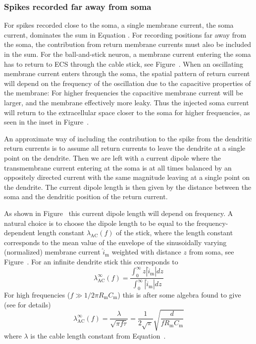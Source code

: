 \subsubsection{Spikes recorded far away from soma}
\label{sec:Spikes:far-spikes}

For spikes recorded close to the soma, a single membrane current, the soma current,
dominates the sum in Equation . 
For recording positions far away from the soma, the contribution from return membrane currents must also be included in the sum. For the ball-and-stick neuron, a membrane current entering the soma has to return to ECS through the cable stick, see Figure~. When an oscillating membrane current enters through the soma, the spatial pattern of return current will depend on the frequency of the oscillation due to the capacitive properties of the membrane: For higher frequencies the capacitive membrane current will be larger, and the membrane effectively more leaky. Thus the injected soma current will return to the extracellular space 
closer to the soma for higher frequencies, as  seen in the inset in Figure~.  

An approximate way of including the contribution to the spike from the dendritic return currents is to
assume all return currents to leave the dendrite at a single point on the dendrite. Then we are left with
a current dipole where the transmembrane current entering at the soma is at all times balanced by an oppositely directed current
with the same magnitude leaving at a single point on the dendrite. The current dipole length is then given by the distance
between the soma and the dendritic position of the return current. 

As shown in Figure~ this current dipole length will depend on frequency.
A natural choice is to choose the dipole length to be equal to the frequency-dependent length constant $\lambda_\mathrm{AC}(f)$ of the stick,
where the length constant corresponds to the mean value of the 
envelope of the sinusoidally varying (normalized) membrane current
$\hat{i}_\mathrm{m}$ weighted with distance $z$ from soma, see Figure~. 
For an infinite dendrite stick this corresponds to
%
\begin{equation}
  \lambda_\mathrm{AC}^\infty(f) = \frac{\int_0^\infty z |\hat{i}_\mathrm{m}| dz}{\int_0^\infty |\hat{i}_\mathrm{m}| dz} 
  \label{eq:Spikes:formula_lambda_ac}
\end{equation}
%
For high frequencies ($f \gg 1/2 \pi R_\mathrm{m} C_\mathrm{m}$) this is after some algebra 
found to give (see  for details)
%
\begin{equation}
 \lambda_\mathrm{AC}^\infty(f) =  \frac{\lambda}{\sqrt{\pi f \tau}} = 
  \frac{1}{2\sqrt{\pi}} \sqrt{\frac{d}{f R_\mathrm{m} C_\mathrm{m}}}
\label{eq:Spikes:approx_lambda_ac}
\end{equation}
%
where $\lambda$ is the cable length constant from Equation~.


